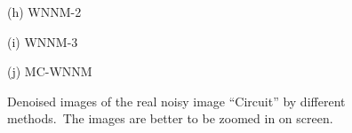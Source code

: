 \documentclass[10pt,onecolumn,letterpaper]{article}
\begin{document}
\begin{figure}
{\begin{minipage}[t]{0.2\textwidth}
{\footnotesize (h) WNNM-2 \cite{wnnm}   }
\end{minipage}
\begin{minipage}[t]{0.2\textwidth}
\centering
{}
{\footnotesize (i) WNNM-3 \cite{wnnm}   }
\end{minipage}
\begin{minipage}[t]{0.2\textwidth}
\centering
{}
{\footnotesize (j) MC-WNNM  }
\end{minipage}
}
\vspace{-2mm}
\caption{Denoised images of the real noisy image ``Circuit'' \cite{ncwebsite} by different methods.\ The images are better to be zoomed in on screen.}
\label{f3}
\end{figure}
\end{document}
